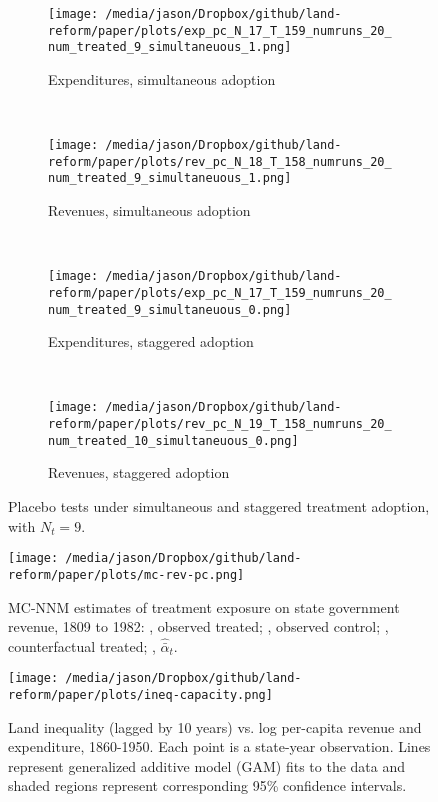 \begin{figure}[htbp]
	\centering
	\begin{subfigure}[t]{0.48\textwidth}
		\centering
		\texttt{[image: /media/jason/Dropbox/github/land-reform/paper/plots/exp\_pc\_N\_17\_T\_159\_numruns\_20\_num\_treated\_9\_simultaneuous\_1.png]}
		\caption{Expenditures, simultaneous adoption}
	\end{subfigure}
	~ 
	\begin{subfigure}[t]{0.48\textwidth}
		\centering
		\texttt{[image: /media/jason/Dropbox/github/land-reform/paper/plots/rev\_pc\_N\_18\_T\_158\_numruns\_20\_num\_treated\_9\_simultaneuous\_1.png]}
		\caption{Revenues, simultaneous adoption}
	\end{subfigure}
	~ 
	\begin{subfigure}[t]{0.48\textwidth}
		\centering
		\texttt{[image: /media/jason/Dropbox/github/land-reform/paper/plots/exp\_pc\_N\_17\_T\_159\_numruns\_20\_num\_treated\_9\_simultaneuous\_0.png]}
		\caption{Expenditures, staggered adoption}
	\end{subfigure}
	~ 
	\begin{subfigure}[t]{0.48\textwidth}
		\centering
		\texttt{[image: /media/jason/Dropbox/github/land-reform/paper/plots/rev\_pc\_N\_19\_T\_158\_numruns\_20\_num\_treated\_10\_simultaneuous\_0.png]}
		\caption{Revenues, staggered adoption}
	\end{subfigure}
	\caption{Placebo tests under simultaneous and staggered treatment adoption, with $N_t = 9$. \label{mc-sim}} 
\end{figure}

\begin{figure}[htbp]
	\centering
	\texttt{[image: /media/jason/Dropbox/github/land-reform/paper/plots/mc-rev-pc.png]}
	\caption{MC-NNM estimates of treatment exposure on state government revenue, 1809 to 1982:
		{\color{Darjeeling15}{\sampleline{}}}, observed treated;
		{}, observed control;
		{}, counterfactual treated;
		{}, $\hat{\bar{\alpha}}_{t}$.\label{mc-estimates-rev-pc}} 
\end{figure}

\begin{figure}[htbp]
	\begin{center}
		\texttt{[image: /media/jason/Dropbox/github/land-reform/paper/plots/ineq-capacity.png]} 
	\end{center}
	\caption{Land inequality (lagged by 10 years) vs. log per-capita revenue and expenditure, 1860-1950. Each point is a state-year observation. Lines represent generalized additive model (GAM) fits to the data and shaded regions represent corresponding 95\% confidence intervals.   \label{fig:ineq-capacity}}
\end{figure} 
